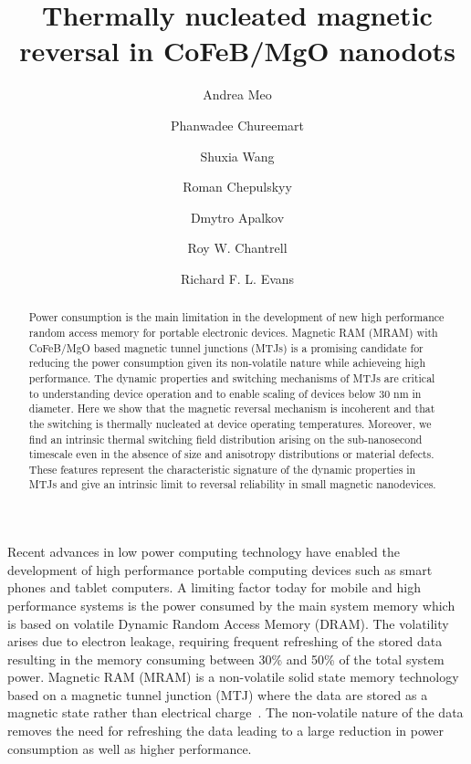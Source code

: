 \documentclass[aps,prb,signlecolumn,preprint,superscriptaddress,10]{revtex4-1}
\begin{document}
\title{Thermally nucleated magnetic reversal in CoFeB/MgO nanodots}
\author{Andrea Meo}
\author{Phanwadee Chureemart}
\author{Shuxia Wang}
\author{Roman Chepulskyy}
\author{Dmytro Apalkov}
\author{Roy W. Chantrell}
\author{Richard F. L. Evans}


\begin{abstract}
Power consumption is the main limitation in the development of new high performance random access memory for portable electronic devices. Magnetic RAM (MRAM) with CoFeB/MgO based magnetic tunnel junctions (MTJs) is a promising candidate for reducing the power consumption given its non-volatile nature while achieveing high performance. The dynamic properties and switching mechanisms of MTJs are critical to understanding device operation and to enable scaling of devices below 30 nm in diameter.
Here we show that the magnetic reversal mechanism is incoherent and that the switching is thermally nucleated  at device operating temperatures. Moreover, we find an intrinsic thermal switching field distribution arising on the sub-nanosecond timescale even in the absence of size and anisotropy distributions or material defects. 
These features represent the characteristic signature of the dynamic properties in MTJs and give an intrinsic limit to reversal reliability in small magnetic nanodevices. 
\end{abstract}

\pacs{}\maketitle
Recent advances in low power computing technology have enabled the development of high performance portable computing devices such as smart phones and tablet computers. A limiting factor today for mobile and high performance systems is the power consumed by the main system memory which is based on volatile Dynamic Random Access Memory (DRAM). The volatility arises due to electron leakage, requiring frequent refreshing of the stored data resulting in the memory consuming between 30\% and 50\% of the total system power\cite{VetterCSE2015}. Magnetic RAM (MRAM) is a non-volatile solid state memory technology~\cite{MRAM_1200123} based on a magnetic tunnel junction (MTJ) where the data are stored as a magnetic state rather than electrical charge~\cite{Gajek2012,samsung-review,7428818}. The non-volatile nature of the data removes the need for refreshing the data leading to a large reduction in power consumption as well as higher performance. 
\end{document}
